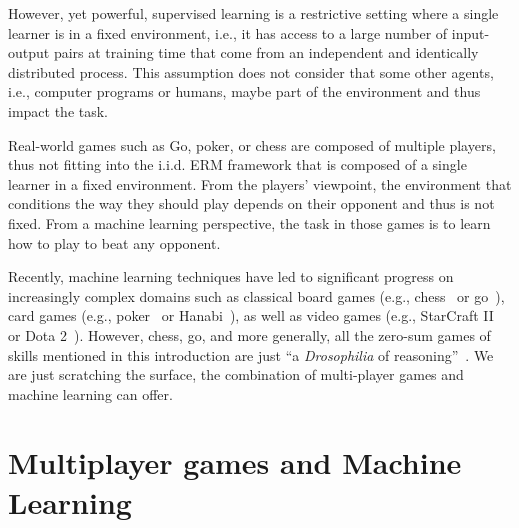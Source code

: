 However, yet powerful, supervised learning is a restrictive setting where a single learner is in a fixed environment, i.e., it has access to a large number of input-output pairs at training time that come from an independent and identically distributed process. This assumption does not consider that some other agents, i.e., computer programs or humans, maybe part of the environment and thus impact the task. 





Real-world games such as Go, poker, or chess are composed of multiple players, thus not fitting into the i.i.d. ERM framework that is composed of a single learner in a fixed environment. From the players’ viewpoint, the environment that conditions the way they should play depends on their opponent and thus is not fixed. From a machine learning perspective, the task in those games is to learn how to play to beat any opponent. 



Recently, machine learning techniques have led to significant progress on increasingly complex domains such as classical board games (e.g., chess~\citep{silver2018general} or go~\citep{silver2017mastering}), card games (e.g., poker~\citep{brown2017safe,brown2019superhuman} or Hanabi~\citep{foerster2019bayesian}), as well as video games (e.g., StarCraft II~\citep{vinyals2019grandmaster} or Dota 2~\citep{berner2019dota}). However, chess, go, and more generally, all the zero-sum games of skills mentioned in this introduction are just ``a \emph{Drosophilia} of reasoning''~\citep{kasparov2018chess}. We are just scratching the surface, the combination of multi-player games and machine learning can offer. 











\section{Multiplayer games and Machine Learning}




